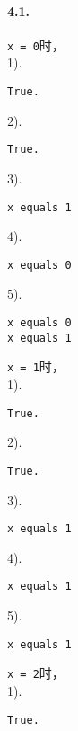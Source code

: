 \documentclass[UTF8]{ctexart}
\begin{document}
\pagestyle{main}

\paragraph{4.1.\\}
\texttt{x = 0}时，\\
1).
\begin{lstlisting}[showspaces=true, showlines=true]
True.
\end{lstlisting}
2).
\begin{lstlisting}[showspaces=true, showlines=true]
True.
\end{lstlisting}
3).\begin{lstlisting}[showspaces=true, showlines=true]
x equals 1

\end{lstlisting}
4).\begin{lstlisting}[showspaces=true, showlines=true]
x equals 0

\end{lstlisting}
5).\begin{lstlisting}[showspaces=true, showlines=true]
x equals 0
x equals 1

\end{lstlisting}
\vspace{1em}
\texttt{x = 1}时，\\
1).
\begin{lstlisting}[showspaces=true, showlines=true]
True.
\end{lstlisting}
2).
\begin{lstlisting}[showspaces=true, showlines=true]
True.
\end{lstlisting}
3).\begin{lstlisting}[showspaces=true, showlines=true]
x equals 1

\end{lstlisting}
4).\begin{lstlisting}[showspaces=true, showlines=true]
x equals 1

\end{lstlisting}
5).\begin{lstlisting}[showspaces=true, showlines=true]
x equals 1

\end{lstlisting}
\vspace{1em}\texttt{x = 2}时，\\
1).
\begin{lstlisting}[showspaces=true, showlines=true]
True.
\end{lstlisting}
\end{document}
